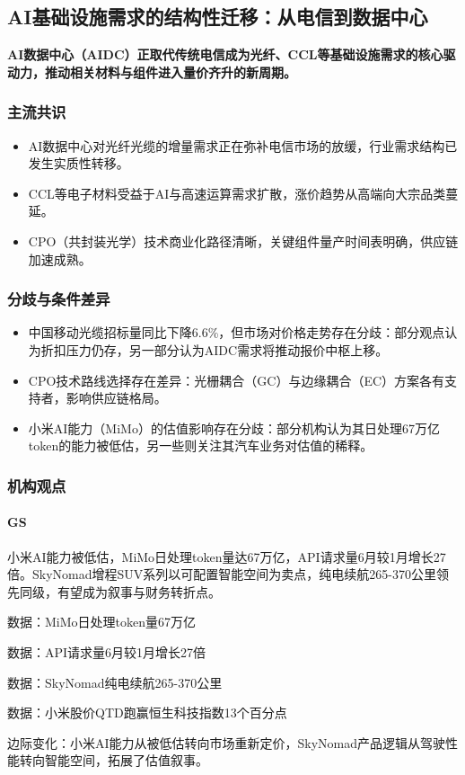 \documentclass[11pt]{ctexart}
\begin{document}
\subsection{AI基础设施需求的结构性迁移：从电信到数据中心}
\textbf{AI数据中心（AIDC）正取代传统电信成为光纤、CCL等基础设施需求的核心驱动力，推动相关材料与组件进入量价齐升的新周期。}
\subsubsection*{主流共识}
\begin{itemize}
  \item AI数据中心对光纤光缆的增量需求正在弥补电信市场的放缓，行业需求结构已发生实质性转移。
  \item CCL等电子材料受益于AI与高速运算需求扩散，涨价趋势从高端向大宗品类蔓延。
  \item CPO（共封装光学）技术商业化路径清晰，关键组件量产时间表明确，供应链加速成熟。
\end{itemize}
\subsubsection*{分歧与条件差异}
\begin{itemize}
  \item 中国移动光缆招标量同比下降6.6\%，但市场对价格走势存在分歧：部分观点认为折扣压力仍存，另一部分认为AIDC需求将推动报价中枢上移。
  \item CPO技术路线选择存在差异：光栅耦合（GC）与边缘耦合（EC）方案各有支持者，影响供应链格局。
  \item 小米AI能力（MiMo）的估值影响存在分歧：部分机构认为其日处理67万亿token的能力被低估，另一些则关注其汽车业务对估值的稀释。
\end{itemize}
\subsubsection*{机构观点}
\paragraph{GS} 小米AI能力被低估，MiMo日处理token量达67万亿，API请求量6月较1月增长27倍。SkyNomad增程SUV系列以可配置智能空间为卖点，纯电续航265-370公里领先同级，有望成为叙事与财务转折点。
{\small\color{refgray}数据：MiMo日处理token量67万亿\par}
{\small\color{refgray}数据：API请求量6月较1月增长27倍\par}
{\small\color{refgray}数据：SkyNomad纯电续航265-370公里\par}
{\small\color{refgray}数据：小米股价QTD跑赢恒生科技指数13个百分点\par}
{\small\color{refgray}边际变化：小米AI能力从被低估转向市场重新定价，SkyNomad产品逻辑从驾驶性能转向智能空间，拓展了估值叙事。\par}
\end{document}
